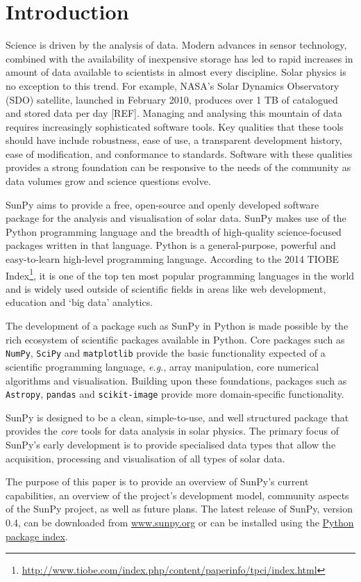 \section{Introduction}\label{sec:Intro}

Science is driven by the analysis of data. Modern advances in sensor
technology, combined with the availability of inexpensive storage has led to
rapid increases in amount of data available to scientists in almost
every discipline.  Solar physics is no exception to this trend. For example, NASA's
Solar Dynamics Observatory (SDO) satellite, launched in February 2010,
produces over 1 TB of catalogued and stored data per day [REF]. Managing and
analysing this mountain of data
requires increasingly sophisticated software tools.  Key qualities
that these tools should have include robustness, ease of use, a
transparent development history, ease of modification, and conformance
to standards.  Software with these qualities provides a strong
foundation can be responsive to the needs of the community as data
volumes grow and science questions evolve.

SunPy aims to provide a free, open-source and openly developed software package 
for the analysis and visualisation of solar data. SunPy makes use of the Python 
programming language and the breadth of high-quality science-focused packages 
written in that language. Python is a general-purpose, 
powerful and easy-to-learn high-level programming language.
According to the 2014 TIOBE Index\footnote{\url{http://www.tiobe.com/index.php/content/paperinfo/tpci/index.html}},
 it is one of the top ten most popular programming languages in the world 
and is widely used outside of scientific fields in areas like web development, education 
and `big data' analytics.


The development of a package such as SunPy in Python is made possible by the 
rich ecosystem of scientific packages available in Python. Core packages such as \texttt{NumPy}, \texttt{SciPy} and \texttt{matplotlib} 
provide the basic functionality expected of a scientific programming language,
\textit{e.g.}, array manipulation, core numerical algorithms and visualisation. 
Building upon these foundations, packages such as \texttt{Astropy}, \texttt{pandas} and 
\texttt{scikit-image} provide more domain-specific functionality.

SunPy is designed to be a clean, simple-to-use, and well 
structured package that provides the \textit{core} tools for data analysis in 
solar physics. The primary focus of SunPy's early development is to provide 
specialised data types that allow the acquisition, processing and 
visualisation of all types of solar data.

The purpose of this paper is to provide an overview of SunPy's current 
capabilities, an overview of the project's development model, community aspects of the 
SunPy project, as well as future plans. The latest release of SunPy, version 0.4,
can be downloaded from \href{http://sunpy.org}{www.sunpy.org} or can be
installed using the \href{http://pypi.python.org/pypi}{Python package index}.
